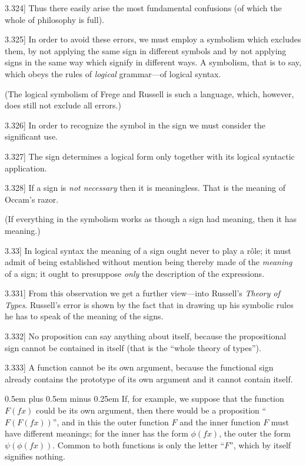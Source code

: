 \documentclass[12pt,oneside]{book}[2007/10/19]
\newcommand{\PropositionE}[2]{%
  \item[\phantomsection\label{PropE:#1}\PropGRef{#1}] #2%
}
\newcommand{\PropGRef}[1]{\hyperref[PropG:#1]{#1}}
\newcommand{\BookTitle}[1]{\emph{#1}}
\newcommand{\verystretchyspace}{\spaceskip0.5em plus 0.5em minus 0.25em}
\begin{document}
\begin{propositions}
\PropositionE{3.324}
{Thus there easily arise the most fundamental
confusions (of which the whole of philosophy is
full).}


\PropositionE{3.325}
{In order to avoid these errors, we must employ
a symbolism which excludes them, by not applying
the same sign in different symbols and by
not applying signs in the same way which signify
in different ways. A symbolism, that is to say,
which obeys the rules of \emph{logical} grammar---of logical
syntax.

(The logical symbolism of Frege and Russell
is such a language, which, however, does still not
exclude all errors.)}


\PropositionE{3.326}
{In order to recognize the symbol in the sign
we must consider the significant use.}


\PropositionE{3.327}
{The sign determines a logical form only together
with its logical syntactic application.}


\PropositionE{3.328}
{If a sign is \emph{not necessary} then it is meaningless.
That is the meaning of Occam's razor.

(If everything in the symbolism works as
though a sign had meaning, then it has meaning.)}


\PropositionE{3.33}
{In logical syntax the meaning of a sign ought
never to play a rôle; it must admit of being
established without mention being thereby made
of the \emph{meaning} of a sign; it ought to presuppose
\emph{only} the description of the expressions.}


\PropositionE{3.331}
{From this observation we get a further view---into
Russell's \BookTitle{Theory of Types}. Russell's error is
shown by the fact that in drawing up his symbolic
rules he has to speak of the meaning of
the signs.}


\PropositionE{3.332}
{No proposition can say anything about itself,
because the propositional sign cannot be contained
in itself (that is the ``whole theory of types'').}


\PropositionE{3.333}
{A function cannot be its own argument, because
the functional sign already contains the prototype
of its own argument and it cannot contain
itself.

{\verystretchyspace
If, for example, we suppose that the function
$F(fx)$ could be its own argument, then there would
be a proposition ``$F(F(fx))$'', and in this the outer
function $F$ and the inner function $F$ must have
different meanings; for the inner has the form
$\phi(fx)$, the outer the form $\psi(\phi(fx))$. Common to
both functions is only the letter ``$F$'', which by
itself signifies nothing.}

}
\end{propositions}
\end{document}
